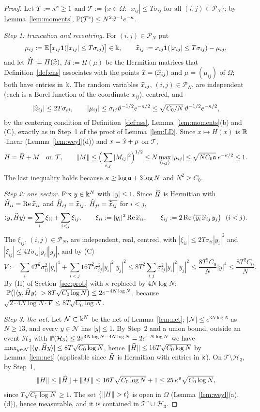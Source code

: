 \begin{proof}
Let $T:=\kappa^{\mathfrak{a}}\ge1$ and $\mathcal T:=\{x\in\Omega:\ |x_{ij}|\le T\sigma_{ij}\text{ for all }(i,j)\in\mathcal P_N\}$; by Lemma~\ref{lem:moments}, $\mathbb{P}(\mathcal T^c)\le N^2\vartheta^{-1}e^{-\kappa}$.

\emph{Step 1: truncation and recentring.} For $(i,j)\in\mathcal P_N$ put
\[
 \mu_{ij}:=\mathbb{E}\big[x_{ij}\mathbf{1}(|x_{ij}|\le T\sigma_{ij})\big]\in\Bbbk,\qquad\widehat x_{ij}:=x_{ij}\mathbf{1}(|x_{ij}|\le T\sigma_{ij})-\mu_{ij},
\]
and let $\widehat H:=H(\widehat x)$, $M:=H(\mu)$ be the Hermitian matrices that Definition~\ref{def:ens} associates with the points $\widehat x=(\widehat x_{ij})$ and $\mu=(\mu_{ij})$ of $\Omega$; both have entries in $\Bbbk$.
The random variables $\widehat x_{ij}$, $(i,j)\in\mathcal P_N$, are independent (each is a Borel function of the coordinate $x_{ij}$), centred, and
\[
 |\widehat x_{ij}|\le2T\sigma_{ij},\qquad|\mu_{ij}|\le\sigma_{ij}\vartheta^{-1/2}e^{-\kappa/2}\le\sqrt{C_0/N}\,\vartheta^{-1/2}e^{-\kappa/2},
\]
by the centering condition of Definition~\ref{def:ass}, Lemma~\ref{lem:moments}(b) and (C), exactly as in Step~1 of the proof of Lemma~\ref{lem:LD}. Since $x\mapsto H(x)$ is $\mathbb{R}$-linear (Lemma~\ref{lem:weyl}(d)) and $x=\widehat x+\mu$ on $\mathcal T$,
\[
 H=\widehat H+M\quad\text{on }\mathcal T,\qquad\|M\|\le\Big(\sum_{i,j}|M_{ij}|^2\Big)^{1/2}\le N\max_{(i,j)}|\mu_{ij}|\le\sqrt{NC_0\mathfrak{a}}\;e^{-\kappa/2}\le1 .
\]
The last inequality holds because $\kappa\ge\log\mathfrak{a}+3\log N$ and $N^2\ge C_0$.

\emph{Step 2: one vector.} Fix $y\in\Bbbk^N$ with $|y|\le1$. Since $\widehat H$ is Hermitian with $\widehat H_{ii}=\operatorname{Re}\widehat x_{ii}$ and $\widehat H_{ij}=\widehat x_{ij}$, $\widehat H_{ji}=\overline{\widehat x_{ij}}$ for $i<j$,
\[
 \langle y,\wh Hy\rangle=\sum_i\xi_{ii}+\sum_{i<j}\xi_{ij},\qquad\xi_{ii}:=|y_i|^2\re\wh x_{ii},\qquad\xi_{ij}:=2\re\big(\ol{y_i}\,\wh x_{ij}\,y_j\big)\ \ (i<j).
\]
The $\xi_{ij}$, $(i,j)\in\mathcal P_N$, are independent, real, centred, with $|\xi_{ii}|\le2T\sigma_{ii}|y_i|^2$ and $|\xi_{ij}|\le4T\sigma_{ij}|y_i||y_j|$, and by (C)
\[
 V:=\sum_i4T^2\sigma_{ii}^2|y_i|^4+\sum_{i<j}16T^2\sigma_{ij}^2|y_i|^2|y_j|^2\le8T^2\sum_{i,j}\sigma_{ij}^2|y_i|^2|y_j|^2\le\frac{8T^2C_0}N|y|^4\le\frac{8T^2C_0}N .
\]
By (H) of Section~\ref{sec:prob} with $\kappa$ replaced by $4N\log N$: $\ \PP\big(|\langle y,\wh Hy\rangle|>8T\sqrt{C_0\log N}\big)\le2e^{-4N\log N}$, because $\sqrt{2\cdot4N\log N\cdot V}\le8T\sqrt{C_0\log N}$.

\emph{Step 3: the net.} Let $\mathcal N\subset\Bbbk^N$ be the net of Lemma~\ref{lem:net}; $|\mathcal N|\le e^{3N\log N}$ as $N\ge13$, and every $y\in\mathcal N$ has $|y|\le1$. By Step~2 and a union bound, outside an event $\mathcal H_3$ with
$\mathbb{P}(\mathcal H_3)\le2e^{3N\log N-4N\log N}=2e^{-N\log N}$ we have $\max_{y\in\mathcal N}|\langle y,\widehat Hy\rangle|\le8T\sqrt{C_0\log N}$, hence $\|\widehat H\|\le16T\sqrt{C_0\log N}$ by Lemma~\ref{lem:net}
(applicable since $\widehat H$ is Hermitian with entries in $\Bbbk$). On $\mathcal T\setminus\mathcal H_3$, by Step~1,
\[
 \|H\|\le\|\widehat H\|+\|M\|\le16T\sqrt{C_0\log N}+1\le25\,\kappa^{\mathfrak{a}}\sqrt{C_0\log N},
\]
since $T\sqrt{C_0\log N}\ge1$. The set $\{\norm H>t\}$ is open in $\Omega$ (Lemma~\ref{lem:weyl}(a),(d)), hence measurable, and it is contained in $\mathcal T^c\cup\mathcal H_3$.
\end{proof}
